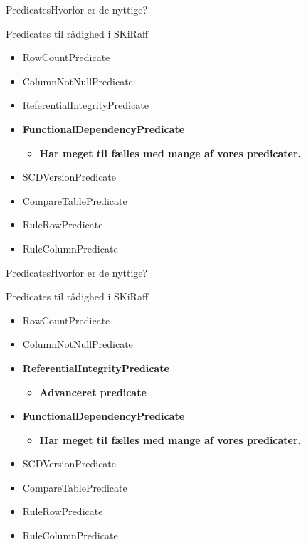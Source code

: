 \begin{frame}{Predicates}{Hvorfor er de nyttige?}
	\begin{block}{Predicates til rådighed i SKiRaff}
		\begin{itemize}
			\item<1-> RowCountPredicate
			\item<1-> ColumnNotNullPredicate
			\item<1-> ReferentialIntegrityPredicate
			\item<1-> \textbf{FunctionalDependencyPredicate}
				\begin{itemize}
					\item<1-> \textbf{Har meget til fælles med mange af vores predicater.}
				\end{itemize}			
			\item<1-> SCDVersionPredicate
			\item<1-> CompareTablePredicate
			\item<1-> RuleRowPredicate
			\item<1-> RuleColumnPredicate
		\end{itemize}
	\end{block}
\end{frame}

\begin{frame}{Predicates}{Hvorfor er de nyttige?}
	\begin{block}{Predicates til rådighed i SKiRaff}
		\begin{itemize}
			\item<1-> RowCountPredicate
			\item<1-> ColumnNotNullPredicate
			\item<1-> \textbf{ReferentialIntegrityPredicate}
				\begin{itemize}
					\item<1-> \textbf{Advanceret predicate}
				\end{itemize}
			\item<1-> \textbf{FunctionalDependencyPredicate}
				\begin{itemize}
					\item<1-> \textbf{Har meget til fælles med mange af vores predicater.}
				\end{itemize}			
			\item<1-> SCDVersionPredicate
			\item<1-> CompareTablePredicate
			\item<1-> RuleRowPredicate
			\item<1-> RuleColumnPredicate
		\end{itemize}
	\end{block}
\end{frame}

